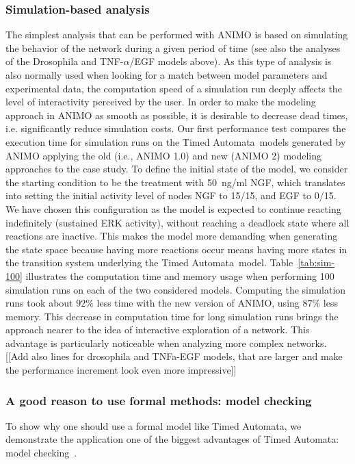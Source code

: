 \documentclass{bmcart}
\def\tas{Timed Automata}
\def\animo2{ANIMO 2}
\begin{document}
\subsubsection*{Simulation-based analysis}
The simplest analysis that can be performed with ANIMO is based on simulating the behavior
of the network during a given period of time (see also the analyses
of the Drosophila and TNF-$\alpha$/EGF models above). As this type of analysis is also normally
used when looking for a match between model parameters and experimental data, the computation
speed of a simulation run deeply affects the level of interactivity perceived by the user.
In order to make
the modeling approach in ANIMO as smooth as possible, it is desirable to decrease dead times,
i.e. significantly reduce simulation costs.
Our first performance test compares the execution time for simulation runs on the \tas\ models
generated by ANIMO applying the old (i.e., ANIMO 1.0) and new (\animo2{}) modeling approaches to the case study.
To define the initial state of the model, we consider the starting condition to be the treatment with 50~ng/ml NGF, which translates into
setting the initial activity level of nodes NGF to 15/15, and EGF to 0/15. We have chosen this configuration as the
model is expected to continue reacting indefinitely (sustained ERK activity), without reaching a deadlock state where all reactions are inactive.
This makes the model more demanding when generating the state space
because having more reactions occur means having more states in the transition system underlying the \tas\ model.
Table~\ref{tab:sim-100} illustrates the computation time and memory usage when performing 100 simulation runs on each of the
two considered models. Computing the simulation runs took about $92 \%$ less time with the new version of ANIMO, using $87 \%$
less memory. This decrease in computation time for long simulation runs brings the approach nearer to the idea
of interactive exploration of a network. This advantage is particularly noticeable when analyzing
more complex networks.
{\Large [[Add also lines for drosophila and TNFa-EGF models, that are larger and make the performance increment look even more impressive]]}


\subsubsection*{A good reason to use formal methods: model checking}
To show why one should use a formal model like \tas, we demonstrate the application
one of the biggest advantages of \tas: model checking~\cite{model-checking}.
\end{document}
